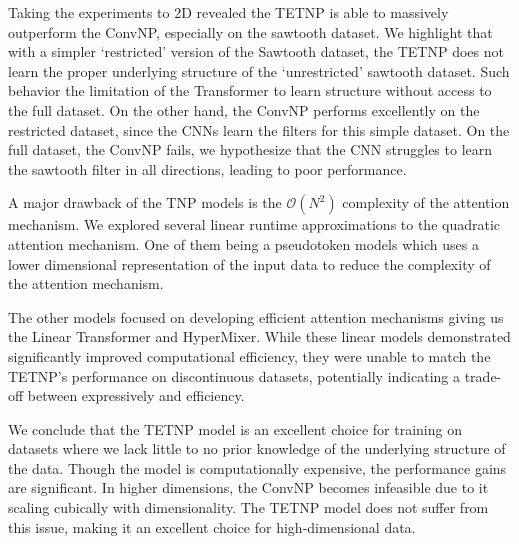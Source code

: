 \documentclass[../../main.tex]{subfiles}
\begin{document}
Taking the experiments to 2D revealed the TETNP is able to massively outperform the ConvNP, especially on the sawtooth dataset. We highlight that with a simpler `restricted' version of the Sawtooth dataset, the TETNP does not learn the proper underlying structure of the `unrestricted' sawtooth dataset. Such behavior the limitation of the Transformer to learn structure without access to the full dataset. On the other hand, the ConvNP performs excellently on the restricted dataset, since the CNNs learn the filters for this simple dataset. On the full dataset, the ConvNP fails, we hypothesize that the CNN struggles to learn the sawtooth filter in all directions, leading to poor performance.

A major drawback of the TNP models is the $\mathcal{O}(N^2)$ complexity of the attention mechanism. We explored several linear runtime approximations to the quadratic attention mechanism. One of them being a  pseudotoken models which uses a lower dimensional representation of the input data to reduce the complexity of the attention mechanism. 

The other models focused on developing efficient attention mechanisms giving us the Linear Transformer and HyperMixer. While these linear models demonstrated significantly improved computational efficiency, they were unable to match the TETNP's performance on discontinuous datasets, potentially indicating a trade-off between expressively and efficiency. 

We conclude that the TETNP model is an excellent choice for training on datasets where we lack little to no prior knowledge of the underlying structure of the data. Though the model is computationally expensive, the performance gains are significant. In higher dimensions, the ConvNP becomes infeasible due to it scaling cubically with dimensionality. The TETNP model does not suffer from this issue, making it an excellent choice for high-dimensional data.

\ifSubfilesClassLoaded{%
    \printbibliography{}
}{} 
\end{document}
